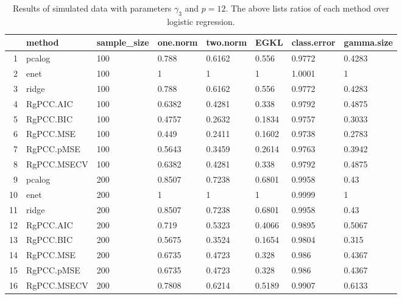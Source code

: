 \begin{table}[ht]
\centering
\begin{tabular}{rlllllll}
  \hline
 & method & sample\_size & one.norm & two.norm & EGKL & class.error & gamma.size \\ 
  \hline
1 & pcalog & 100 & 0.788 & 0.6162 & 0.556 & 0.9772 & 0.4283 \\ 
  2 & enet & 100 & 1 & 1 & 1 & 1.0001 & 1 \\ 
  3 & ridge & 100 & 0.788 & 0.6162 & 0.556 & 0.9772 & 0.4283 \\ 
  4 & RgPCC.AIC & 100 & 0.6382 & 0.4281 & 0.338 & 0.9792 & 0.4875 \\ 
  5 & RgPCC.BIC & 100 & 0.4757 & 0.2632 & 0.1834 & 0.9757 & 0.3033 \\ 
  6 & RgPCC.MSE & 100 & 0.449 & 0.2411 & 0.1602 & 0.9738 & 0.2783 \\ 
  7 & RgPCC.pMSE & 100 & 0.5643 & 0.3459 & 0.2614 & 0.9763 & 0.3942 \\ 
  8 & RgPCC.MSECV & 100 & 0.6382 & 0.4281 & 0.338 & 0.9792 & 0.4875 \\ 
  9 & pcalog & 200 & 0.8507 & 0.7238 & 0.6801 & 0.9958 & 0.43 \\ 
  10 & enet & 200 & 1 & 1 & 1 & 0.9999 & 1 \\ 
  11 & ridge & 200 & 0.8507 & 0.7238 & 0.6801 & 0.9958 & 0.43 \\ 
  12 & RgPCC.AIC & 200 & 0.719 & 0.5323 & 0.4066 & 0.9895 & 0.5067 \\ 
  13 & RgPCC.BIC & 200 & 0.5675 & 0.3524 & 0.1654 & 0.9804 & 0.315 \\ 
  14 & RgPCC.MSE & 200 & 0.6735 & 0.4723 & 0.328 & 0.986 & 0.4367 \\ 
  15 & RgPCC.pMSE & 200 & 0.6735 & 0.4723 & 0.328 & 0.986 & 0.4367 \\ 
  16 & RgPCC.MSECV & 200 & 0.7808 & 0.6214 & 0.5189 & 0.9907 & 0.6133 \\ 
   \hline
\end{tabular}
\caption{Results of simulated data with parameters $\gamma_3$ and $p =12$. The above lists ratios of each method over logistic regression.} 
\label{fig-3-leadnew-12-metrics-pratio}
\end{table}
